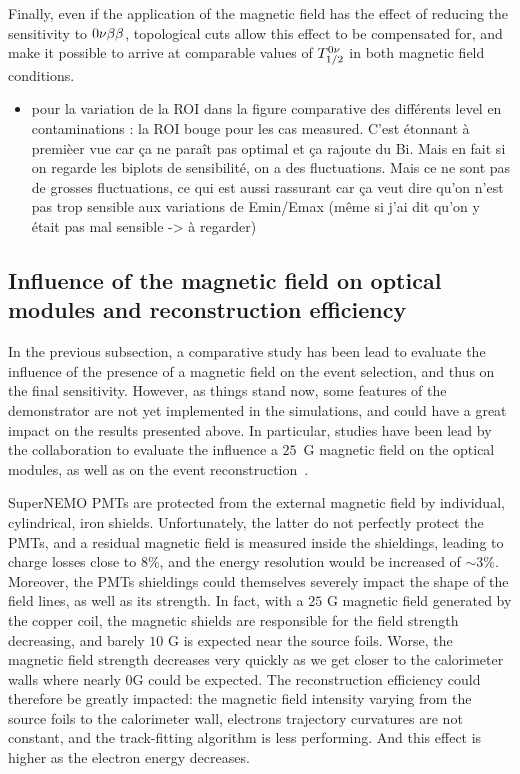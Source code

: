 Finally, even if the application of the magnetic field has the effect of reducing the sensitivity to $0\nu\beta\beta$, topological cuts allow this effect to be compensated for, and make it possible to arrive at comparable values of $T_{1/2}^{0\nu}$ in both magnetic field conditions.

\begin{itemize}
\item pour la variation de la ROI dans la figure comparative des différents level en contaminations : la ROI bouge pour les cas measured. C'est étonnant à premièer vue car ça ne paraît pas optimal et ça rajoute du Bi. Mais en fait si on regarde  les biplots de sensibilité, on a des fluctuations. Mais ce ne sont pas de grosses fluctuations, ce qui est aussi rassurant car ça veut dire qu'on n'est pas trop sensible aux variations de Emin/Emax (même si j'ai dit qu'on y était pas mal sensible -> à regarder)
\end{itemize}

\subsection{Influence of the magnetic field on optical modules and reconstruction efficiency}

In the previous subsection, a comparative study has been lead to evaluate the influence of the presence of a magnetic field on the event selection, and thus on the final sensitivity.
However, as things stand now, some features of the demonstrator are not yet implemented in the simulations, and could have a great impact on the results presented above.
In particular, studies have been lead by the collaboration to evaluate the influence a $25$~G magnetic field on the optical modules,  as well as on the event reconstruction~\cite{CalvezThesis}\cite{internal:magnetic_field}.

SuperNEMO PMTs are protected from the external magnetic field by individual, cylindrical, iron shields.
Unfortunately, the latter do not perfectly protect the PMTs, and a residual magnetic field is measured inside the shieldings, leading to charge losses close to $8\%$, and the energy resolution would be increased of $\sim 3\%$.
Moreover, the PMTs shieldings could themselves severely impact the shape of the field lines, as well as its strength.
In fact, with a $25$ G magnetic field generated by the copper coil, the magnetic shields are responsible for the field strength decreasing, and barely $10$ G is expected near the source foils.
Worse, the magnetic field strength decreases very quickly as we get closer to the calorimeter walls where nearly 0G could be expected.
The reconstruction efficiency could therefore be greatly impacted:
the magnetic field intensity varying from the source foils to the calorimeter wall, electrons trajectory curvatures are not constant, and the track-fitting algorithm is less performing.
And this effect is higher as the electron energy decreases.

